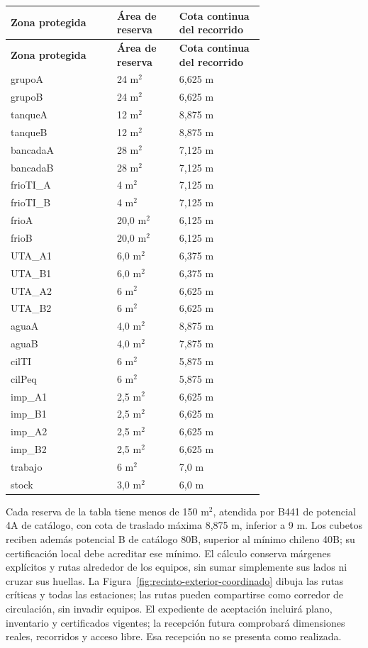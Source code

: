\begin{longtable}{|p{0.30\linewidth}|p{0.17\linewidth}|p{0.24\linewidth}|}
\hline \textbf{Zona protegida} & \textbf{Área de reserva} & \textbf{Cota continua del recorrido} \\\hline
\endfirsthead
\hline \textbf{Zona protegida} & \textbf{Área de reserva} & \textbf{Cota continua del recorrido} \\\hline
\endhead
grupoA & 24 m$^2$ & 6,625 m \\\hline
grupoB & 24 m$^2$ & 6,625 m \\\hline
tanqueA & 12 m$^2$ & 8,875 m \\\hline
tanqueB & 12 m$^2$ & 8,875 m \\\hline
bancadaA & 28 m$^2$ & 7,125 m \\\hline
bancadaB & 28 m$^2$ & 7,125 m \\\hline
frioTI\_A & 4 m$^2$ & 7,125 m \\\hline
frioTI\_B & 4 m$^2$ & 7,125 m \\\hline
frioA & 20,0 m$^2$ & 6,125 m \\\hline
frioB & 20,0 m$^2$ & 6,125 m \\\hline
UTA\_A1 & 6,0 m$^2$ & 6,375 m \\\hline
UTA\_B1 & 6,0 m$^2$ & 6,375 m \\\hline
UTA\_A2 & 6 m$^2$ & 6,625 m \\\hline
UTA\_B2 & 6 m$^2$ & 6,625 m \\\hline
aguaA & 4,0 m$^2$ & 8,875 m \\\hline
aguaB & 4,0 m$^2$ & 7,875 m \\\hline
cilTI & 6 m$^2$ & 5,875 m \\\hline
cilPeq & 6 m$^2$ & 5,875 m \\\hline
imp\_A1 & 2,5 m$^2$ & 6,625 m \\\hline
imp\_B1 & 2,5 m$^2$ & 6,625 m \\\hline
imp\_A2 & 2,5 m$^2$ & 6,625 m \\\hline
imp\_B2 & 2,5 m$^2$ & 6,625 m \\\hline
trabajo & 6 m$^2$ & 7,0 m \\\hline
stock & 3,0 m$^2$ & 6,0 m \\\hline
\end{longtable}
Cada reserva de la tabla tiene menos de 150 m$^2$, atendida por B441 de potencial 4A de catálogo, con cota de traslado máxima 8,875 m, inferior a 9 m. Los cubetos reciben además potencial B de catálogo 80B, superior al mínimo chileno 40B; su certificación local debe acreditar ese mínimo. El cálculo conserva márgenes explícitos y rutas alrededor de los equipos, sin sumar simplemente sus lados ni cruzar sus huellas. La Figura~\ref{fig:recinto-exterior-coordinado} dibuja las rutas críticas y todas las estaciones; las rutas pueden compartirse como corredor de circulación, sin invadir equipos. El expediente de aceptación incluirá plano, inventario y certificados vigentes; la recepción futura comprobará dimensiones reales, recorridos y acceso libre. Esa recepción no se presenta como realizada.

